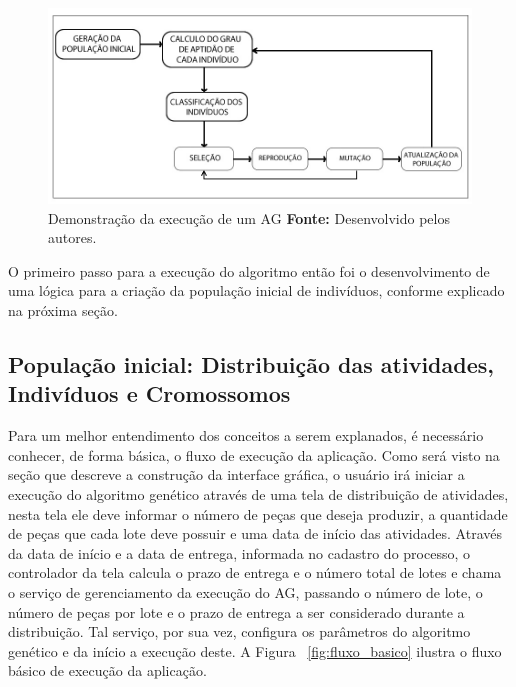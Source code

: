 \begin{figure}[h!]
	\centerline{\includegraphics[scale=0.6]{./imagens/algoritimos_geneticos.jpg}}
	\caption[Demonstração da execução de um AG]
	{Demonstração da execução de um AG \textbf{Fonte:} Desenvolvido pelos autores.}
	\label{fig:exec_ag}
\end{figure}

\newpage


\par O primeiro passo para a execução do algoritmo então foi o desenvolvimento de uma lógica para a criação
da população inicial de indivíduos, conforme explicado na próxima seção.

\subsection {População inicial: Distribuição das atividades, Indivíduos e Cromossomos}

\par Para um melhor entendimento dos conceitos a serem explanados, é necessário
conhecer, de forma básica, o fluxo de execução da aplicação. Como será visto na seção que descreve a construção
da interface gráfica, o usuário irá iniciar a execução do algoritmo genético através de uma tela de distribuição de atividades, nesta tela ele deve informar o número de peças que deseja produzir, a quantidade de peças que cada lote deve possuir e uma data de início das atividades. Através da data de início e a data de entrega, informada no cadastro do processo, o controlador da tela calcula o prazo de entrega e o número total de lotes e chama o serviço de gerenciamento da execução do AG, passando o número de lote, o número de peças por lote e o prazo de entrega a ser considerado durante a distribuição. Tal serviço, por sua vez, configura os parâmetros do algoritmo genético e da início a execução deste. A Figura ~\ref{fig:fluxo_basico} ilustra o fluxo básico de execução da aplicação.

